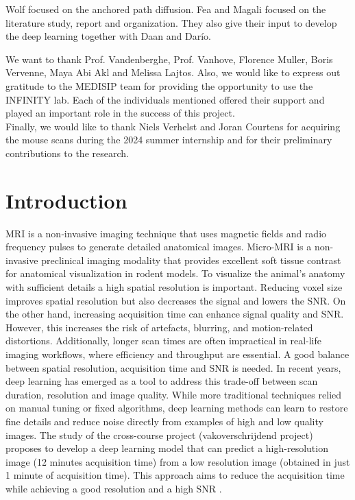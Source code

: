 \documentclass[twocolumn]{article}
\begin{document}
Wolf focused on the anchored path diffusion. Fea and Magali focused on the literature study, report and organization. 
They also give their input to develop the deep learning together with Daan and Darío.

We want to thank Prof. Vandenberghe, Prof. Vanhove, Florence Muller, Boris Vervenne, Maya Abi Akl and Melissa Lajtos. 
Also, we would like to express out gratitude to the MEDISIP team for providing the opportunity to use the INFINITY lab. 
Each of the individuals mentioned offered their support and played an important role in the success of this project. \\

Finally, we would like to thank Niels Verhelst and Joran Courtens for acquiring the mouse scans during the 2024 summer internship and for their preliminary contributions to the research.



\newpage
\section{Introduction}

MRI is a non‐invasive imaging technique that uses magnetic fields and radio frequency pulses to generate detailed anatomical images. 
Micro-MRI is a non-invasive preclinical imaging modality that provides excellent soft tissue contrast for anatomical visualization in rodent models. 
To visualize the animal's anatomy with sufficient details a high spatial resolution is important. Reducing voxel size improves spatial resolution but also decreases the signal and lowers the SNR. 
On the other hand, increasing acquisition time can enhance signal quality and SNR. However, this increases the risk of artefacts, blurring, and motion-related distortions. 
Additionally, longer scan times are often impractical in real-life imaging workflows, where efficiency and throughput are essential. 
A good balance between spatial resolution, acquisition time and SNR is needed.
In recent years, deep learning has emerged as a tool to address this trade-off between scan duration, resolution and image quality. 
While more traditional techniques relied on manual tuning or fixed algorithms, deep learning methods can learn to restore fine details and reduce noise directly from examples of high and low quality images. 
The study of the cross-course project (vakoverschrijdend project) proposes to develop a deep learning model that can predict a high-resolution image (12 minutes acquisition time) from a low resolution image (obtained in just 1 minute of acquisition time). 
This approach aims to reduce the acquisition time while achieving a good resolution and a high SNR \cite{brown2014magnetic}. 
\end{document}
